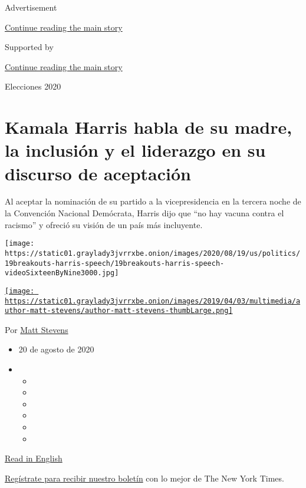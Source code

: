 Advertisement

\protect\hyperlink{after-top}{Continue reading the main story}

Supported by

\protect\hyperlink{after-sponsor}{Continue reading the main story}

Elecciones 2020

\hypertarget{kamala-harris-habla-de-su-madre-la-inclusiuxf3n-y-el-liderazgo-en-su-discurso-de-aceptaciuxf3n}{%
\section{Kamala Harris habla de su madre, la inclusión y el liderazgo en
su discurso de
aceptación}\label{kamala-harris-habla-de-su-madre-la-inclusiuxf3n-y-el-liderazgo-en-su-discurso-de-aceptaciuxf3n}}

Al aceptar la nominación de su partido a la vicepresidencia en la
tercera noche de la Convención Nacional Demócrata, Harris dijo que ``no
hay vacuna contra el racismo'' y ofreció su visión de un país más
incluyente.

\texttt{[image: https://static01.graylady3jvrrxbe.onion/images/2020/08/19/us/politics/19breakouts-harris-speech/19breakouts-harris-speech-videoSixteenByNine3000.jpg]}

\href{https://www.nytimes3xbfgragh.onion/by/matt-stevens}{\texttt{[image: https://static01.graylady3jvrrxbe.onion/images/2019/04/03/multimedia/author-matt-stevens/author-matt-stevens-thumbLarge.png]}}

Por \href{https://www.nytimes3xbfgragh.onion/by/matt-stevens}{Matt
Stevens}

\begin{itemize}
\item
  20 de agosto de 2020
\item
  \begin{itemize}
  \item
  \item
  \item
  \item
  \item
  \item
  \end{itemize}
\end{itemize}

\href{https://www.nytimes3xbfgragh.onion/2020/08/19/us/politics/kamala-harris-dnc-speech.html}{Read
in English}

\href{https://www.nytimes3xbfgragh.onion/newsletters/el-times}{Regístrate
para recibir nuestro boletín} con lo mejor de The New York Times.

